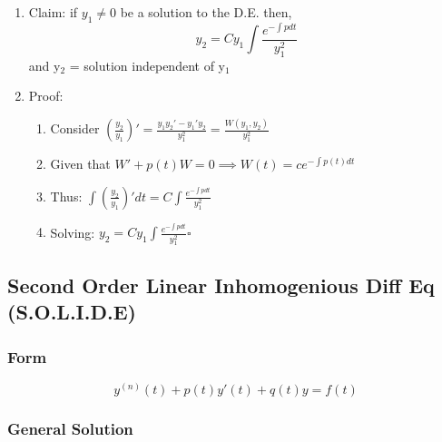 \documentclass[11pt]{article}
\begin{document}
\begin{enumerate}
\item Claim: if $y_1\neq 0$ be a solution to the D.E. then,
       \begin{equation}
       y_2 = Cy_1\int \frac{e^{-\int p dt}}{y_1^2}
       \end{equation}
       and y$_2$ = solution independent of y$_1$
\item Proof:

\begin{enumerate}
\item Consider $(\frac{y_2}{y_1})' = \frac{y_1 y_2' - y_1'y_2}{y_1^2}=\frac{W(y_1,y_2)}{y_1^2}$
\item Given that $W'+p(t)W=0 \implies W(t)=ce^{-\int p(t) dt}$
\item Thus: $\int (\frac{y_2}{y_1})'dt = C \int \frac{e^{-\int p
          dt}}{y_1^2}$
\item Solving: $y_2=Cy_1\int \frac{e^{-\int p
          dt}}{y_1^2} \square$
\end{enumerate}

\end{enumerate}
\subsection{Second Order Linear Inhomogenious Diff Eq (S.O.L.I.D.E)}
\label{sec-11.5}

\subsubsection{Form}
\label{sec-11.5.1}

    \begin{equation}
    y^{(n)}(t)+p(t)y'(t)+q(t)y=f(t)
    \end{equation}
\subsubsection{General Solution}
\label{sec-11.5.2}
\end{document}
